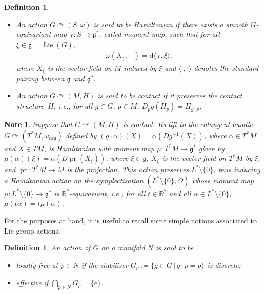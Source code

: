 \documentclass[pdftex]{sigma}
\numberwithin{equation}{section}
\newtheorem{Definition}[Theorem]{Definition}
\newtheorem{Note}[Theorem]{Note}
\newcommand{\de}{\mathrm{d}} %
\newcommand{\CM}{(M,H)} %
\newcommand{\SM}{(S,\omega)} %
\newcommand{\SYM}{L^* \setminus \{0\}} %
\newcommand{\RR}{\mathbb{R}}
\begin{document}
\begin{Definition}\label{defn:ham_ctct}\quad
 \begin{itemize}\itemsep=0pt
 \item An action $G \curvearrowright \SM$ is said to be {\it Hamiltonian} if there exists a smooth $G$-equivariant map $\chi\colon S \to \mathfrak{g}^*$, called {\it moment map}, such that for all $\xi \in \mathfrak{g} = \operatorname{Lie}(G)$,
 \begin{gather*}
 \omega(X_{\xi}, -) = \de \langle \chi, \xi \rangle,
 \end{gather*}
 where $X_{\xi}$ is the vector f\/ield on $M$ induced by $\xi$ and $\langle \cdot,\cdot \rangle$ denotes the standard pairing between $\mathfrak{g}$ and $\mathfrak{g}^*$.
 \item An action $G \curvearrowright \CM$ is said to be {\it contact} if it preserves the contact structure~$H$, i.e., for all $g \in G$, $p \in M$, $D_pg(H_p) = H_{g \cdot p}$.
 \end{itemize}
\end{Definition}

\begin{Note}\label{obs:contact_action_lift}
Suppose that $G \curvearrowright \CM$ is contact. Its lift to the cotangent bundle $G \curvearrowright (T^*M,\omega_{\mathrm{can}})$ def\/ined by $(g \cdot \alpha)(X) = \alpha(D g^{-1}(X))$, where $\alpha \in T^*M$ and $X \in TM$, is Hamiltonian with moment map $\mu\colon T^*M \to \mathfrak{g}^*$ given by $\mu(\alpha)(\xi) = \alpha (D \operatorname{pr} (X_{\xi} ) )$, where $\xi \in \mathfrak{g}$, $X_{\xi}$ is the vector f\/ield on $T^*M$ by $\xi$, and $\operatorname{pr} \colon T^*M \to M$ is the projection. This action preserves $L^* \setminus \{0\}$, thus inducing a Hamiltonian action on the symplectisation $(\SYM,\Omega)$ whose moment map $\mu \colon \SYM \to \mathfrak{g}^*$ is $\RR^*$-equivariant, i.e., for all $t \in
\RR^*$ and all $\alpha \in \SYM$, $\mu(t\alpha) = t\mu(\alpha)$.
\end{Note}

For the purposes at hand, it is useful to recall some simple notions associated to Lie group actions.

\begin{Definition}\label{defn:action}
 An action of $G$ on a manifold $N$ is said to be
 \begin{itemize}\itemsep=0pt
 \item {\it locally free} at $p \in N$ if the stabiliser $G_p := \{ g \in G \,|\, g \cdot p = p \}$ is discrete;
 \item {\it effective} if $\bigcap\limits_{p \in N} G_p = \{e\}$.
 \end{itemize}
\end{Definition}
\end{document}
